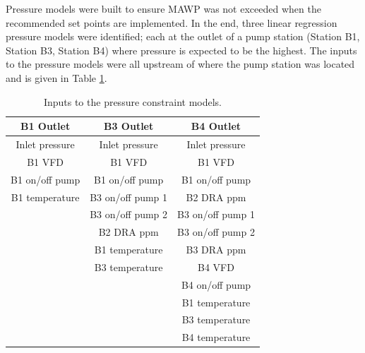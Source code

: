 Pressure models were built to ensure MAWP was not exceeded when the recommended set points are implemented. In the end, three linear regression pressure models were identified; each at the outlet of a pump station (Station B1, Station B3, Station B4) where pressure is expected to be the highest. The inputs to the pressure models were all upstream of where the pump station was located and is given in Table \ref{tab:08pressure_inputs}.

\begin{table}[]
    \centering
    {
    \begin{tabular}{c|c|c}
         B1 Outlet & B3 Outlet & B4 Outlet \\
         \hline
         
         Inlet pressure & Inlet pressure & Inlet pressure \\
         
         B1 VFD & B1 VFD & B1 VFD \\
         
         B1 on/off pump & B1 on/off pump & B1 on/off pump \\
         
          B1 temperature & B3 on/off pump 1 & B2 DRA ppm \\
         
         & B3 on/off pump 2 & B3 on/off pump 1 \\
         
         & B2 DRA ppm & B3 on/off pump 2 \\
         
         & B1 temperature & B3 DRA ppm \\
         
         & B3 temperature & B4 VFD \\
         & & B4 on/off pump \\
         & & B1 temperature \\
         & & B3 temperature \\
         & & B4 temperature \\
    \end{tabular}}
    \caption{Inputs to the pressure constraint models.}
    \label{tab:08pressure_inputs}
\end{table}

